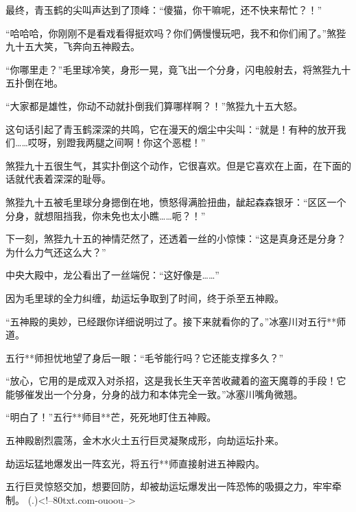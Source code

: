 \begin{this_body}
最终，青玉鹤的尖叫声达到了顶峰：“傻猫，你干嘛呢，还不快来帮忙？！”

“哈哈哈，你刚刚不是看戏看得挺欢吗？你们俩慢慢玩吧，我不和你们闹了。”煞狴九十五大笑，飞奔向五神殿去。

“你哪里走？”毛里球冷笑，身形一晃，竟飞出一个分身，闪电般射去，将煞狴九十五扑倒在地。

“大家都是雄性，你动不动就扑倒我们算哪样啊？！”煞狴九十五大怒。

这句话引起了青玉鹤深深的共鸣，它在漫天的烟尘中尖叫：“就是！有种的放开我们……哎呀，别蹬我两腿之间啊！你这个恶棍！”

煞狴九十五很生气，其实扑倒这个动作，它很喜欢。但是它喜欢在上面，在下面的话就代表着深深的耻辱。

煞狴九十五被毛里球分身摁倒在地，愤怒得满脸扭曲，龇起森森银牙：“区区一个分身，就想阻挡我，你未免也太小瞧……呃？！”

下一刻，煞狴九十五的神情茫然了，还透着一丝的小惊悚：“这是真身还是分身？为什么力气还这么大？”

中央大殿中，龙公看出了一丝端倪：“这好像是……”

因为毛里球的全力纠缠，劫运坛争取到了时间，终于杀至五神殿。

“五神殿的奥妙，已经跟你详细说明过了。接下来就看你的了。”冰塞川对五行**师道。

五行**师担忧地望了身后一眼：“毛爷能行吗？它还能支撑多久？”

“放心，它用的是成双入对杀招，这是我长生天辛苦收藏着的盗天魔尊的手段！它能够催发出一个分身，分身的战力和本体完全一致。”冰塞川嘴角微翘。

“明白了！”五行**师目**芒，死死地盯住五神殿。

五神殿剧烈震荡，金木水火土五行巨灵凝聚成形，向劫运坛扑来。

劫运坛猛地爆发出一阵玄光，将五行**师直接射进五神殿内。

五行巨灵惊怒交加，想要回防，却被劫运坛爆发出一阵恐怖的吸摄之力，牢牢牵制。	 (.)<!--80txt.com-ouoou-->

\end{this_body}

